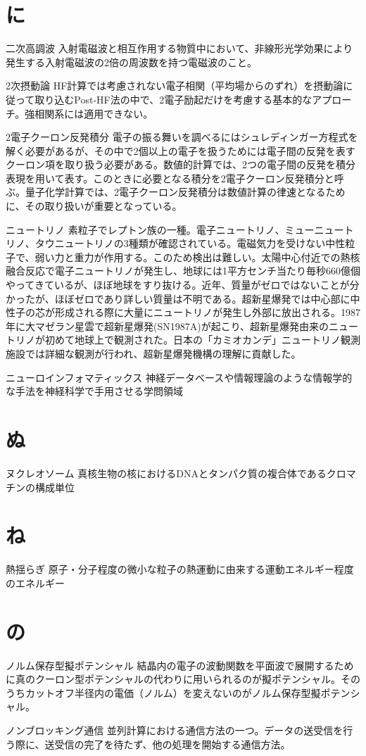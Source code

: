 \begin{用語集}
\section{に}
\item{二次高調波}{}
{入射電磁波と相互作用する物質中において、非線形光学効果により発生する入射電磁波の2倍の周波数を持つ電磁波のこと。}
\item{2次摂動論}{}
{HF計算では考慮されない電子相関（平均場からのずれ）を摂動論に従って取り込むPost-HF法の中で、2電子励起だけを考慮する基本的なアプローチ。強相関系には適用できない。}
\item{2電子クーロン反発積分}{}
{電子の振る舞いを調べるにはシュレディンガー方程式を解く必要があるが、その中で2個以上の電子を扱うためには電子間の反発を表すクーロン項を取り扱う必要がある。数値的計算では、2つの電子間の反発を積分表現を用いて表す。このときに必要となる積分を2電子クーロン反発積分と呼ぶ。量子化学計算では、2電子クーロン反発積分は数値計算の律速となるために、その取り扱いが重要となっている。}
\item{ニュートリノ}{}
{素粒子でレプトン族の一種。電子ニュートリノ、ミューニュートリノ、タウニュートリノの3種類が確認されている。電磁気力を受けない中性粒子で、弱い力と重力が作用する。このため検出は難しい。太陽中心付近での熱核融合反応で電子ニュートリノが発生し、地球には1平方センチ当たり毎秒660億個やってきているが、ほぼ地球をすり抜ける。近年、質量がゼロではないことが分かったが、ほぼゼロであり詳しい質量は不明である。超新星爆発では中心部に中性子の芯が形成される際に大量にニュートリノが発生し外部に放出される。1987年に大マゼラン星雲で超新星爆発(SN1987A)が起こり、超新星爆発由来のニュートリノが初めて地球上で観測された。日本の「カミオカンデ」ニュートリノ観測施設では詳細な観測が行われ、超新星爆発機構の理解に貢献した。}
\item{ニューロインフォマティックス}{}
{神経データベースや情報理論のような情報学的な手法を神経科学で手用させる学問領域}
\section{ぬ}
\item{ヌクレオソーム}{}
{真核生物の核におけるDNAとタンパク質の複合体であるクロマチンの構成単位}
\section{ね}
\item{熱揺らぎ}{}
{原子・分子程度の微小な粒子の熱運動に由来する運動エネルギー程度のエネルギー}
\section{の}
\item{ノルム保存型擬ポテンシャル}{}
{結晶内の電子の波動関数を平面波で展開するために真のクーロン型ポテンシャルの代わりに用いられるのが擬ポテンシャル。そのうちカットオフ半径内の電価（ノルム）を変えないのがノルム保存型擬ポテンシャル。}
\item{ノンブロッキング通信}{}
{並列計算における通信方法の一つ。データの送受信を行う際に、送受信の完了を待たず、他の処理を開始する通信方法。}

\end{用語集}
